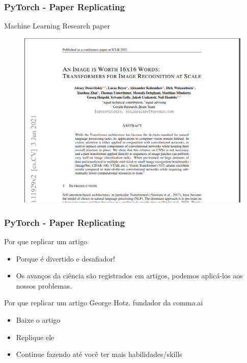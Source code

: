 \documentclass{beamer}
\begin{document}
\begin{frame}
	\frametitle{PyTorch - Paper Replicating}
	\begin{block}{Machine Learning Research paper}
	\begin{figure}
		\centering
		\includegraphics[width=0.7\linewidth]{figures/an-image-is-worth-16x16-words-transformers-1}
	\end{figure}
	\end{block}
\end{frame} 
\begin{frame}
	\frametitle{PyTorch - Paper Replicating}
	\begin{block}{Por que replicar um artigo}
		\begin{itemize}
			\item Porque é divertido e desafiador!
			\item Os avanços da ciência são registrados em artigos, podemos aplicá-los aos nossos problemas.
		\end{itemize}
	\end{block}
	\begin{block}{Por que replicar um artigo}
		George Hotz. fundador da comma.ai
		\begin{itemize}
			\item Baixe o artigo
			\item Replique ele
			\item Continue fazendo até você ter mais habilidades/skills
		\end{itemize}
	\end{block}
\end{frame} 
\end{document}
